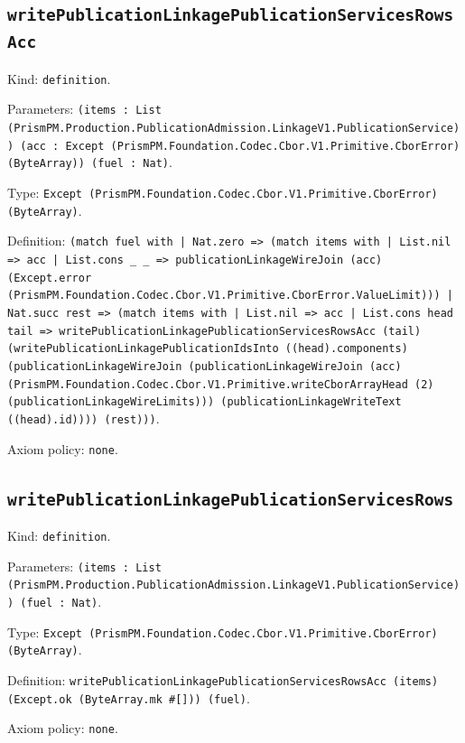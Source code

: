\documentclass[11pt]{article}
\begin{document}
\subsection*{\texttt{writePublicationLinkagePublicationServicesRowsAcc}}
\noindent Kind: \texttt{definition}.\par
\noindent Parameters: \texttt{(items : List (PrismPM.Production.PublicationAdmission.LinkageV1.PublicationService)) (acc : Except (PrismPM.Foundation.Codec.Cbor.V1.Primitive.CborError) (ByteArray)) (fuel : Nat)}.\par
\noindent Type: \texttt{Except (PrismPM.Foundation.Codec.Cbor.V1.Primitive.CborError) (ByteArray)}.\par
\noindent Definition: \texttt{(match fuel with | Nat.zero => (match items with | List.nil => acc | List.cons \_ \_ => publicationLinkageWireJoin (acc) (Except.error (PrismPM.Foundation.Codec.Cbor.V1.Primitive.CborError.ValueLimit))) | Nat.succ rest => (match items with | List.nil => acc | List.cons head tail => writePublicationLinkagePublicationServicesRowsAcc (tail) (writePublicationLinkagePublicationIdsInto ((head).components) (publicationLinkageWireJoin (publicationLinkageWireJoin (acc) (PrismPM.Foundation.Codec.Cbor.V1.Primitive.writeCborArrayHead (2) (publicationLinkageWireLimits))) (publicationLinkageWriteText ((head).id)))) (rest)))}.\par
\noindent Axiom policy: \texttt{none}.\par
\subsection*{\texttt{writePublicationLinkagePublicationServicesRows}}
\noindent Kind: \texttt{definition}.\par
\noindent Parameters: \texttt{(items : List (PrismPM.Production.PublicationAdmission.LinkageV1.PublicationService)) (fuel : Nat)}.\par
\noindent Type: \texttt{Except (PrismPM.Foundation.Codec.Cbor.V1.Primitive.CborError) (ByteArray)}.\par
\noindent Definition: \texttt{writePublicationLinkagePublicationServicesRowsAcc (items) (Except.ok (ByteArray.mk \#[])) (fuel)}.\par
\noindent Axiom policy: \texttt{none}.\par
\end{document}
